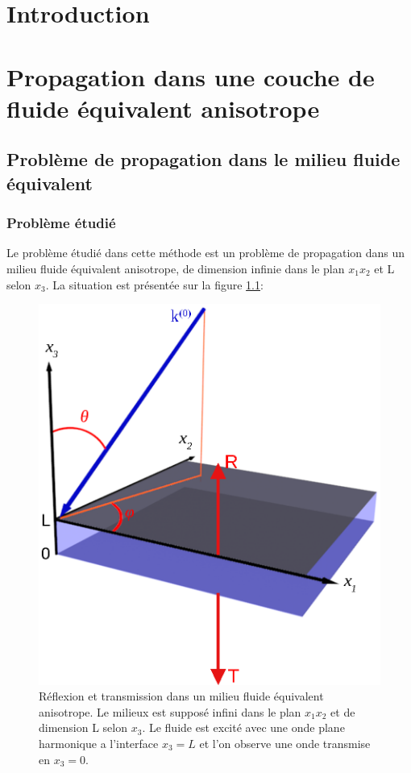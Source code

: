 \documentclass[12pt]{report}
\begin{document}
\newpage
\chapter*{Introduction}
 \setcounter{page}{1}
   
\chapter{Propagation dans une couche de fluide équivalent anisotrope}
\label{Ch_Prop}
\section{Problème de propagation dans le milieu fluide équivalent}
\label{Ch_Prop_S_Pb}
\subsection{Problème étudié}
\label{Ch_Prop_S_Pb_SS_Pb}
    Le problème étudié dans cette méthode est un problème de propagation dans un milieu fluide équivalent anisotrope, de dimension infinie dans le plan $x_1x_2$ et L selon $x_3$.  La situation est présentée sur la figure \ref{Schema}:
    \begin{figure}[ht!]
    \centering
    \includegraphics[scale=1]{Fig3D.eps}
    \caption{Réflexion et transmission dans un milieu fluide équivalent anisotrope. Le milieux est supposé infini dans le plan $x_1x_2$ et de dimension L selon $x_3$. Le fluide est excité avec une onde plane harmonique a l'interface $x_3=L$ et l'on observe une onde transmise en $x_3=0$. }
    \label{Schema}
    \end{figure}
    
\end{document}
